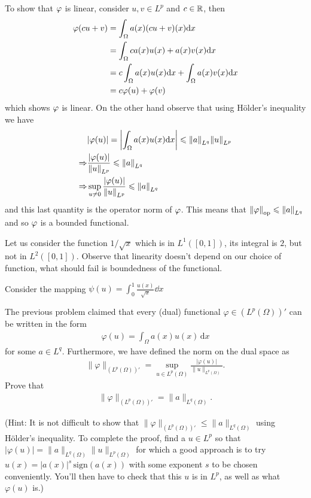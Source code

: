 \documentclass[12pt]{memoir}
\begin{document}
\begin{ptcbr}
  To show that $\varphi$ is linear, consider $u,v\in L^p$ and $c\in\mathbb{R}$, then 
  \begin{align*}
  \varphi(cu+v)&=\int_\Omega a(x)(cu+v)(x)\dd x\\
  &=\int_\Omega ca(x)u(x)+a(x)v(x)\dd x\\
  &=c\int_\Omega a(x)u(x)\dd x+\int_\Omega a(x)v(x)\dd x\\
  &=c\varphi(u)+\varphi(v)
  \end{align*}
  which shows $\varphi$ is linear. On the other hand observe that using H\"older's inequality we have 
\begin{align*}
  &|\varphi(u)|=\left|\int_\Omega a(x)u(x)\dd x\right|\leqslant\norm{a}_{L^q}\norm{u}_{L^p}\\
  \Rightarrow& \frac{|\varphi(u)|}{\norm{u}_{L^p}}\leqslant\norm{a}_{L^q}\\
  \Rightarrow&\sup_{u\neq 0}\frac{|\varphi(u)|}{\norm{u}_{L^p}}\leqslant\norm{a}_{L^q}
\end{align*}
  and this last quantity is the operator norm of $\varphi$. This means that $\norm{\varphi}_{\text{op}}\leqslant\norm{a}_{L^q}$ and so $\varphi$ is a bounded functional.\par
  Let us consider the function $1/\sqrt{x}$ which is in $L^1([0,1])$, its integral is $2$, but not in $L^2([0,1])$. Observe that linearity doesn't depend on our choice of function, what should fail is boundedness of the functional.\par 
  Consider the mapping $\psi(u)=\int_{0}^1\frac{u(x)}{\sqrt{x}}\dd x$
\end{ptcbr}
\begin{Ej}
    The previous problem claimed that every (dual) functional $\varphi\in (L^p(\Omega))'$
can be written in the form
\begin{align*}
  \varphi(u) = \int_\Omega a(x) u(x) \, \text{d}x
\end{align*}
for some $a\in L^q$. Furthermore, we have defined the norm on the dual
space as
\begin{align*}
  \|\varphi\|_{(L^p(\Omega))'} =
  \sup_{u\in L^p(\Omega)} \frac{|\varphi(u)|}{\|u\|_{L^p(\Omega)}}.
\end{align*}
Prove that
\begin{align*}
  \|\varphi\|_{(L^p(\Omega))'} = \|a\|_{L^q(\Omega)}.
\end{align*}

(Hint: It is not difficult to show that $\|\varphi\|_{(L^p(\Omega))'}
\le \|a\|_{L^q(\Omega)}$ using H\"older's inequality. To complete the proof, find a $u\in L^p$ so
  that $|\varphi(u)|=\|a\|_{L^q(\Omega)}\|u\|_{L^p(\Omega)}$ for which
  a good approach is to try $u(x)=|a(x)|^s \,\text{sign}(a(x))$ with some exponent $s$ to
  be chosen conveniently. You'll then have to check that this $u$ is
  in $L^p$, as well as what $\varphi(u)$ is.)
\end{Ej}
\end{document}
